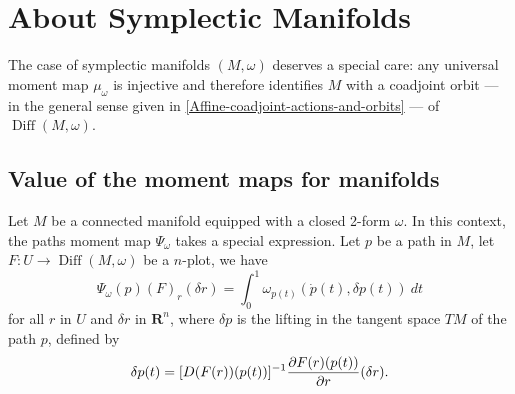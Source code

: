 \documentclass[10pt,reqno,twoside]{amsart}
\newcommand{\RR}{\mathbf{R}}
\DeclareMathOperator{\Diff}{Diff}
\newcommand{\D}{D}
\theoremstyle{plain}
\theoremstyle{definition}
\newcommand{\article}[1]{\subsection{#1}}
\begin{document}
  \section{About Symplectic Manifolds}
  
  The case of symplectic manifolds $(M, \omega)$ deserves a special care:
  any universal moment map $\mu_\omega$ is injective and therefore identifies $M$ with a coadjoint orbit
  --- in the general sense given in \ref{Affine-coadjoint-actions-and-orbits} ---
  of $\Diff(M,\omega)$.
  
  \article{Value of the moment maps for manifolds}
  \label{Value-of-the-moment-maps-for-manifolds}
  Let $M$ be a connected manifold equipped with a closed 2-form $\omega$.
  In this context,
  the paths moment map $\Psi_\omega$ takes a special expression.
  Let $p$ be a path in $M$,
  let $F : U \to \Diff(M,\omega)$ be a $n$-plot,
  we have
  \begin{equation}
    \label{eq:diamondsuit2}
    \Psi_\omega(p)(F)_r(\delta r) = \int_0^1 \omega_{p(t)}(\dot p(t), \delta p(t)) \ dt
  \end{equation}
  for all $r$ in $U$ and $\delta r$ in $\RR^n$,
  where $\delta p$ is the lifting in the tangent space $TM$ of the path $p$,
  defined by
  \begin{equation}
    \label{eq:heartsuit3}
    \delta p(t) = [\D(F(r))(p(t))]^{-1} {\partial F(r)(p(t)) \over \partial r} (\delta r).
  \end{equation}
  
\end{document}

